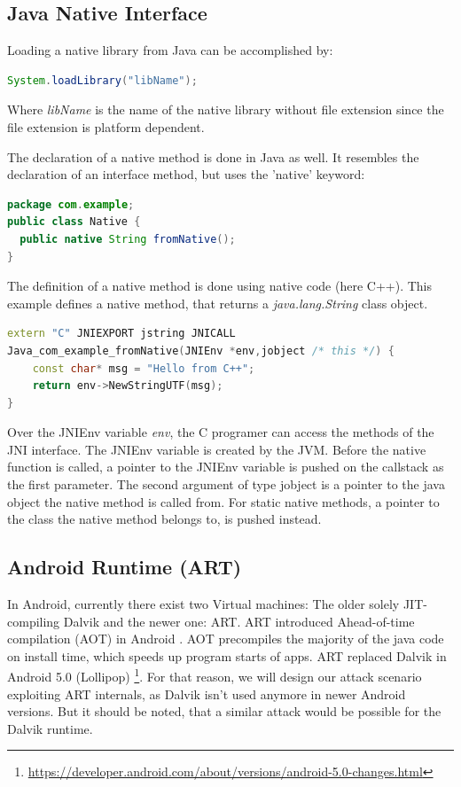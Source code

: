 \subsection{Java Native Interface}

Loading a native library from Java can be accomplished by:
\begin{lstlisting}[language=Java, style=JavaCodeStyle]
 System.loadLibrary("libName");
\end{lstlisting}
Where \emph{libName} is the name of the native library without file extension since the file extension is platform dependent.

The declaration of a native method is done in Java as well. It resembles the declaration of an interface method, but uses the 'native' keyword:
\begin{lstlisting}[language=Java, style=JavaCodeStyle]
package com.example;
public class Native {
  public native String fromNative();
}
\end{lstlisting}

The definition of  a native method is done using native code (here C++). This example defines a native method, that returns a \emph{java.lang.String} class object.
\begin{lstlisting}[language=C++, style=CppCodeStyle]
extern "C" JNIEXPORT jstring JNICALL
Java_com_example_fromNative(JNIEnv *env,jobject /* this */) {
    const char* msg = "Hello from C++";
    return env->NewStringUTF(msg);
}
\end{lstlisting}

Over the JNIEnv variable \emph{env}, the C programer can access the methods of the JNI interface. The JNIEnv variable is created by the JVM. Before the native function is called, a pointer to the JNIEnv variable is pushed on the callstack as the first parameter. The second argument of type jobject is a pointer to the java object the native method is called from. For static native methods, a pointer to the class the native method belongs to, is pushed instead. 

\subsection{Android Runtime (ART)}
In Android, currently there exist two Virtual machines: The older solely JIT-compiling Dalvik and the newer one: ART. ART introduced Ahead-of-time compilation (AOT) in Android \cite{ArtAndDalvik}. AOT precompiles the majority of the java code on install time, which speeds up program starts of apps. ART replaced Dalvik in Android 5.0 (Lollipop) \footnote{\url{https://developer.android.com/about/versions/android-5.0-changes.html}}. For that reason, we will design our attack scenario exploiting ART internals, as Dalvik isn't used anymore in newer Android versions. But it should be noted, that a similar attack would be possible for the Dalvik runtime.

